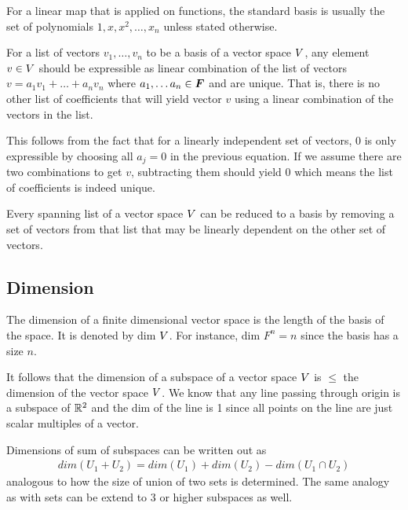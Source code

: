 \documentclass[../../linear_algebra.tex]{subfiles}
\begin{document}
For a linear map that is applied on functions, the standard basis is usually the set of polynomials $1, x, x^{2}, \ldots, x_{n}$ unless stated otherwise.\newline

For a list of vectors $v_{1}, \ldots, v_{n}$ to be a basis of a vector space $V$, any element $v \in V$ should be expressible as linear combination of the list of vectors $v = a_{1}v_{1} + \ldots + a_{n}v_{n}$ where $a_{1}, \ldots a_{n} \in \bm{F}$ and are unique. That is, there is no other list of coefficients that will yield vector $v$ using a linear combination of the vectors in the list.\newline

This follows from the fact that for a linearly independent set of vectors, $0$ is only expressible by choosing all $a_{j} = 0$ in the previous equation. If we assume there are two combinations to get $v$, subtracting them should yield $0$ which means the list of coefficients is indeed unique.\newline

Every spanning list of a vector space $V$ can be reduced to a basis by removing a set of vectors from that list that may be linearly dependent on the other set of vectors.\newline

\subsection{Dimension}
The dimension of a finite dimensional vector space is the length of the basis of the space. It is denoted by dim $V$. For instance, dim $F^{n} = n$ since the basis has a size $n$.\newline

It follows that the dimension of a subspace of a vector space $V$ is $\leq$ the dimension of the vector space $V$. We know that any line passing through origin is a subspace of $\mathbb{R}^{2}$ and the dim of the line is 1 since all points on the line are just scalar multiples of a vector.\newline

Dimensions of sum of subspaces can be written out as
\begin{align*}
    dim(U_{1} + U_{2}) = dim(U_{1}) + dim(U_{2}) - dim(U_{1} \cap U_{2})
\end{align*}
analogous to how the size of union of two sets is determined. The same analogy as with sets can be extend to 3 or higher subspaces as well.
\end{document}
